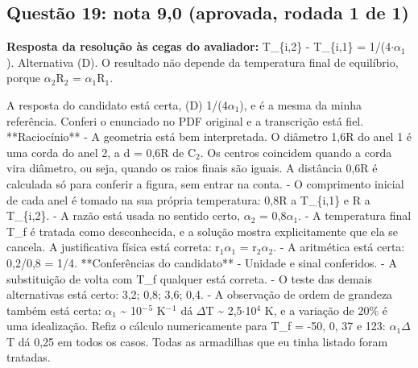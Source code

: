 \documentclass{article}%
\begin{document}
\subsection*{Questão 19: nota 9,0 (aprovada, rodada 1 de 1)}%
\textbf{Resposta da resolução às cegas do avaliador:} T\_\{i,2\} - T\_\{i,1\} = 1/(4$\cdot$$\alpha$$_{1}$). Alternativa (D). O resultado não depende da temperatura final de equilíbrio, porque $\alpha$$_{2}$R$_{2}$ = $\alpha$$_{1}$R$_{1}$.\par %
A resposta do candidato está certa, (D) 1/(4$\alpha$$_{1}$), e é a mesma da minha referência. Conferi o enunciado no PDF original e a transcrição está fiel.\newline%
\newline%
**Raciocínio**\newline%
{-} A geometria está bem interpretada. O diâmetro 1,6R do anel 1 é uma corda do anel 2, a d = 0,6R de C$_{2}$. Os centros coincidem quando a corda vira diâmetro, ou seja, quando os raios finais são iguais. A distância 0,6R é calculada só para conferir a figura, sem entrar na conta.\newline%
{-} O comprimento inicial de cada anel é tomado na sua própria temperatura: 0,8R a T\_\{i,1\} e R a T\_\{i,2\}.\newline%
{-} A razão está usada no sentido certo, $\alpha$$_{2}$ = 0,8$\alpha$$_{1}$.\newline%
{-} A temperatura final T\_f é tratada como desconhecida, e a solução mostra explicitamente que ela se cancela. A justificativa física está correta: r$_{1}$$\alpha$$_{1}$ = r$_{2}$$\alpha$$_{2}$.\newline%
{-} A aritmética está certa: 0,2/0,8 = 1/4.\newline%
\newline%
**Conferências do candidato**\newline%
{-} Unidade e sinal conferidos.\newline%
{-} A substituição de volta com T\_f qualquer está correta.\newline%
{-} O teste das demais alternativas está certo: 3,2; 0,8; 3,6; 0,4.\newline%
{-} A observação de ordem de grandeza também está certa: $\alpha$$_{1}$ \textasciitilde{} 10$^{-}$$^{5}$ K$^{-}$$^{1}$ dá $\Delta$T \textasciitilde{} 2,5$\cdot$10$^{4}$ K, e a variação de 20\% é uma idealização.\newline%
\newline%
Refiz o cálculo numericamente para T\_f = -50, 0, 37 e 123: $\alpha$$_{1}$$\Delta$T dá 0,25 em todos os casos. Todas as armadilhas que eu tinha listado foram tratadas.\newline%
\end{document}
